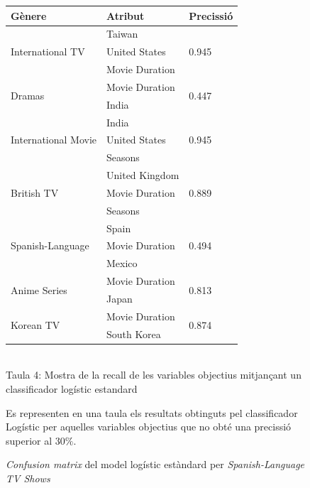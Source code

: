 \documentclass[a4paper, 11pt]{article}
\begin{document}
\begin{figure}[h]
\begin{minipage}{5cm}
\begin{center}
    \caption{\textit{Confusion matrix} del model logístic estàndard per \textit{Spanish-Language TV Shows}}
\end{center}
\end{minipage} %
\hspace{2em}
\begin{minipage}{9cm} %
\begin{center}
    \begin{tabular}{l|l|l}
        \textbf{Gènere} & \textbf{Atribut} & \textbf{Precissió}\\\hline\hline
            \multirow{3}{*}{International TV} &  Taiwan & \multirow{3}{*}{0.945} \\
            & United States & \\
            & Movie Duration& \\ \hline
        \multirow{2}{*}{Dramas} &  Movie Duration & \multirow{2}{*}{0.447} \\
        & India & \\ \hline
        \multirow{3}{*}{International Movie} &  India & \multirow{3}{*}{0.945} \\
            & United States & \\
            & Seasons & \\ \hline
        \multirow{3}{*}{British TV} &  United Kingdom & \multirow{3}{*}{0.889} \\
            & Movie Duration & \\
            & Seasons & \\ \hline
        \multirow{3}{*}{Spanish-Language} &  Spain & \multirow{3}{*}{0.494} \\
            & Movie Duration & \\
            & Mexico & \\ \hline
        \multirow{2}{*}{Anime Series} &  Movie Duration & \multirow{2}{*}{0.813} \\
        & Japan & \\\hline
        \multirow{2}{*}{Korean TV} &  Movie Duration & \multirow{2}{*}{0.874} \\
        & South Korea & \\
    \end{tabular}
    \label{tab:afins}
    \\
    Taula 4: Mostra de la recall de les variables objectius mitjançant un classificador logístic estandard   \setcounter{table}{4}
\end{center}
Es representen en una taula els resultats obtinguts pel classificador Logístic per aquelles variables objectius que no obté una precissió superior al $30\%$.
\end{minipage} %
\end{figure} %
\end{document}
